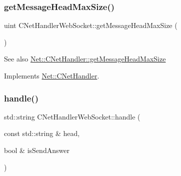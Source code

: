 \mbox{\label{class_net_1_1_c_net_handler_web_socket_a5c3fa1c1f926119482b25159afffb6cd}} 
\subsubsection{\texorpdfstring{get\+Message\+Head\+Max\+Size()}{getMessageHeadMaxSize()}}
{\footnotesize\ttfamily uint C\+Net\+Handler\+Web\+Socket\+::get\+Message\+Head\+Max\+Size (\begin{DoxyParamCaption}{ }\end{DoxyParamCaption})\hspace{0.3cm}{\ttfamily [virtual]}}

\begin{DoxySeeAlso}{See also}
\mbox{\hyperlink{class_net_1_1_c_net_handler_a6d0a79a8fc8126f6bf90e348c90152a7}{Net\+::\+C\+Net\+Handler\+::get\+Message\+Head\+Max\+Size}} 
\end{DoxySeeAlso}


Implements \mbox{\hyperlink{class_net_1_1_c_net_handler_a6d0a79a8fc8126f6bf90e348c90152a7}{Net\+::\+C\+Net\+Handler}}.

\mbox{\label{class_net_1_1_c_net_handler_web_socket_ad4c16a911b8cb26f69dda807b5ca2c70}} 
\subsubsection{\texorpdfstring{handle()}{handle()}}
{\footnotesize\ttfamily std\+::string C\+Net\+Handler\+Web\+Socket\+::handle (\begin{DoxyParamCaption}\item[{const std\+::string \&}]{head,  }\item[{bool \&}]{is\+Send\+Answer }\end{DoxyParamCaption})\hspace{0.3cm}{\ttfamily [virtual]}}

